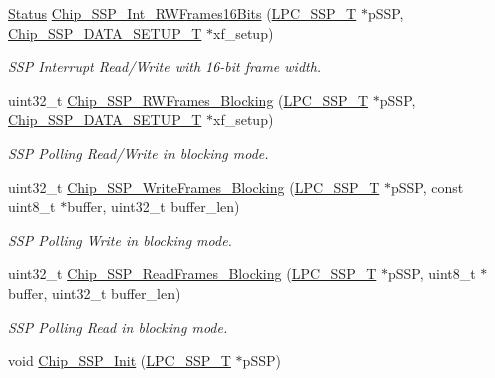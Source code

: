 \begin{DoxyCompactItemize}
\hyperlink{group___l_p_c___types___public___types_ga67a0db04d321a74b7e7fcfd3f1a3f70b}{Status} \hyperlink{group___s_s_p__18_x_x__43_x_x_gaf97dd891912b8312a1e0989d7a542b7b}{Chip\+\_\+\+S\+S\+P\+\_\+\+Int\+\_\+\+R\+W\+Frames16\+Bits} (\hyperlink{struct_l_p_c___s_s_p___t}{L\+P\+C\+\_\+\+S\+S\+P\+\_\+T} $\ast$p\+S\+SP, \hyperlink{struct_chip___s_s_p___d_a_t_a___s_e_t_u_p___t}{Chip\+\_\+\+S\+S\+P\+\_\+\+D\+A\+T\+A\+\_\+\+S\+E\+T\+U\+P\+\_\+T} $\ast$xf\+\_\+setup)
\begin{DoxyCompactList}\small\item\em S\+SP Interrupt Read/\+Write with 16-\/bit frame width. \end{DoxyCompactList}\item 
uint32\+\_\+t \hyperlink{group___s_s_p__18_x_x__43_x_x_ga302a381ad4d291164144ad2720399078}{Chip\+\_\+\+S\+S\+P\+\_\+\+R\+W\+Frames\+\_\+\+Blocking} (\hyperlink{struct_l_p_c___s_s_p___t}{L\+P\+C\+\_\+\+S\+S\+P\+\_\+T} $\ast$p\+S\+SP, \hyperlink{struct_chip___s_s_p___d_a_t_a___s_e_t_u_p___t}{Chip\+\_\+\+S\+S\+P\+\_\+\+D\+A\+T\+A\+\_\+\+S\+E\+T\+U\+P\+\_\+T} $\ast$xf\+\_\+setup)
\begin{DoxyCompactList}\small\item\em S\+SP Polling Read/\+Write in blocking mode. \end{DoxyCompactList}\item 
uint32\+\_\+t \hyperlink{group___s_s_p__18_x_x__43_x_x_ga09fd685c38c8442fb4fc2759c9b8a879}{Chip\+\_\+\+S\+S\+P\+\_\+\+Write\+Frames\+\_\+\+Blocking} (\hyperlink{struct_l_p_c___s_s_p___t}{L\+P\+C\+\_\+\+S\+S\+P\+\_\+T} $\ast$p\+S\+SP, const uint8\+\_\+t $\ast$buffer, uint32\+\_\+t buffer\+\_\+len)
\begin{DoxyCompactList}\small\item\em S\+SP Polling Write in blocking mode. \end{DoxyCompactList}\item 
uint32\+\_\+t \hyperlink{group___s_s_p__18_x_x__43_x_x_ga8332233bb63af754bd9cc369f2a1e2d6}{Chip\+\_\+\+S\+S\+P\+\_\+\+Read\+Frames\+\_\+\+Blocking} (\hyperlink{struct_l_p_c___s_s_p___t}{L\+P\+C\+\_\+\+S\+S\+P\+\_\+T} $\ast$p\+S\+SP, uint8\+\_\+t $\ast$buffer, uint32\+\_\+t buffer\+\_\+len)
\begin{DoxyCompactList}\small\item\em S\+SP Polling Read in blocking mode. \end{DoxyCompactList}\item 
void \hyperlink{group___s_s_p__18_x_x__43_x_x_ga66e20405561e8d3dacba65cbfe41d556}{Chip\+\_\+\+S\+S\+P\+\_\+\+Init} (\hyperlink{struct_l_p_c___s_s_p___t}{L\+P\+C\+\_\+\+S\+S\+P\+\_\+T} $\ast$p\+S\+SP)

\end{DoxyCompactItemize}
